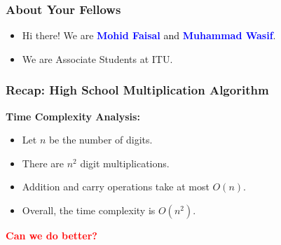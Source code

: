 \begin{frame}
    \frametitle{About Your Fellows}
    \begin{itemize}
        \item Hi there! We are \textcolor{blue}{\textbf{ Mohid Faisal}  \textcolor{black}{and}\textbf{ Muhammad Wasif}}.
        \item We are Associate Students at ITU.
    \end{itemize}
\end{frame}




\begin{frame}
    \frametitle{Recap: High School Multiplication Algorithm}
    \centering
    \textbf{Time Complexity Analysis:}
    \begin{itemize}
        \item Let \( n \) be the number of digits.
        \item There are \( n^2 \) digit multiplications.
        \item Addition and carry operations take at most \( O(n) \).
        \item Overall, the time complexity is \( O(n^2) \).
    \end{itemize}
    
    \vspace{0.5cm}
    \centering\textbf{\textcolor{red}{Can we do better?}}
\end{frame}

